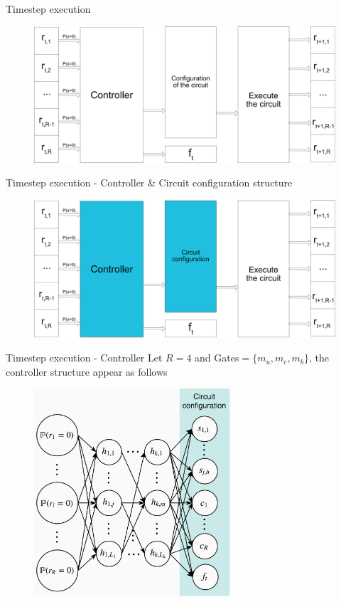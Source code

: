 \documentclass[xcolor={usenames}]{beamer}
\begin{document}
  \begin{frame}{Timestep execution}  
	\begin{figure}
  		\centering
  		\includegraphics[width=\textwidth]{../figures/timestep-nram-without-memory-execution.png}
  	\end{figure}
  \end{frame}  
  \begin{frame}{Timestep execution - Controller \& Circuit configuration structure}
  	\begin{figure}
  		\centering
  		\includegraphics[width=\textwidth]{../figures/timestep-nram-without-memory-execution-CONTROLLER-and-CIRCUIT.png}
  	\end{figure}
  \end{frame}
  \begin{frame}{Timestep execution - Controller}
  	Let $R = 4$ and Gates$ = \{m_u, m_c, m_b\}$, the controller structure appear as follows
  	\begin{figure}
  		\centering
  		\includegraphics[width=0.65\textwidth]{../figures/nram-mlp.png}
  	\end{figure}
  \end{frame}
\end{document}
